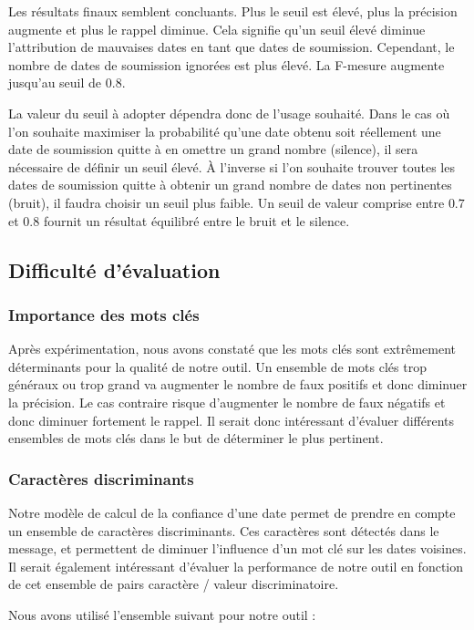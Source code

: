 \documentclass[a4paper,french,10pt]{article}
\begin{document}
Les résultats finaux semblent concluants. Plus le seuil est élevé, plus la précision augmente et plus le rappel diminue. Cela signifie qu'un seuil élevé diminue l'attribution de mauvaises dates en tant que dates de soumission. Cependant, le nombre de dates de soumission ignorées est plus élevé. La F-mesure augmente jusqu'au seuil de $0.8$.

La valeur du seuil à adopter dépendra donc de l'usage souhaité. Dans le cas où l'on souhaite maximiser la probabilité qu'une date obtenu soit réellement une date de soumission quitte à en omettre un grand nombre (silence), il sera nécessaire de définir un seuil élevé. À l'inverse si l'on souhaite trouver toutes les dates de soumission quitte à obtenir un grand nombre de dates non pertinentes (bruit), il faudra choisir un seuil plus faible. Un seuil de valeur comprise entre $0.7$ et $0.8$ fournit un résultat équilibré entre le bruit et le silence.

\subsection{Difficulté d'évaluation}

\subsubsection{Importance des mots clés}
Après expérimentation, nous avons constaté que les mots clés sont extrêmement déterminants pour la qualité de notre outil. Un ensemble de mots clés trop généraux ou trop grand va augmenter le nombre de faux positifs et donc diminuer la précision. Le cas contraire risque d'augmenter le nombre de faux négatifs et donc diminuer fortement le rappel. Il serait donc intéressant d'évaluer différents ensembles de mots clés dans le but de déterminer le plus pertinent.

\subsubsection{Caractères discriminants}
Notre modèle de calcul de la confiance d'une date permet de prendre en compte un ensemble de caractères discriminants. Ces caractères sont détectés dans le message, et permettent de diminuer l'influence d'un mot clé sur les dates voisines. Il serait également intéressant d'évaluer la performance de notre outil en fonction de cet ensemble de pairs caractère / valeur discriminatoire.

Nous avons utilisé l'ensemble suivant pour notre outil :
\end{document}
